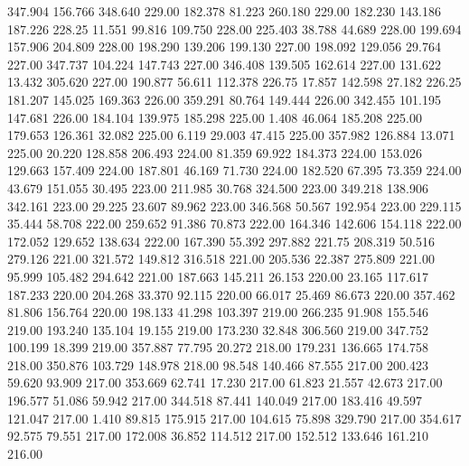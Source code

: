  347.904  156.766  348.640       229.00
 182.378   81.223  260.180       229.00
 182.230  143.186  187.226       228.25
  11.551   99.816  109.750       228.00
 225.403   38.788   44.689       228.00
 199.694  157.906  204.809       228.00
 198.290  139.206  199.130       227.00
 198.092  129.056   29.764       227.00
 347.737  104.224  147.743       227.00
 346.408  139.505  162.614       227.00
 131.622   13.432  305.620       227.00
 190.877   56.611  112.378       226.75
  17.857  142.598   27.182       226.25
 181.207  145.025  169.363       226.00
 359.291   80.764  149.444       226.00
 342.455  101.195  147.681       226.00
 184.104  139.975  185.298       225.00
   1.408   46.064  185.208       225.00
 179.653  126.361   32.082       225.00
   6.119   29.003   47.415       225.00
 357.982  126.884   13.071       225.00
  20.220  128.858  206.493       224.00
  81.359   69.922  184.373       224.00
 153.026  129.663  157.409       224.00
 187.801   46.169   71.730       224.00
 182.520   67.395   73.359       224.00
  43.679  151.055   30.495       223.00
 211.985   30.768  324.500       223.00
 349.218  138.906  342.161       223.00
  29.225   23.607   89.962       223.00
 346.568   50.567  192.954       223.00
 229.115   35.444   58.708       222.00
 259.652   91.386   70.873       222.00
 164.346  142.606  154.118       222.00
 172.052  129.652  138.634       222.00
 167.390   55.392  297.882       221.75
 208.319   50.516  279.126       221.00
 321.572  149.812  316.518       221.00
 205.536   22.387  275.809       221.00
  95.999  105.482  294.642       221.00
 187.663  145.211   26.153       220.00
  23.165  117.617  187.233       220.00
 204.268   33.370   92.115       220.00
  66.017   25.469   86.673       220.00
 357.462   81.806  156.764       220.00
 198.133   41.298  103.397       219.00
 266.235   91.908  155.546       219.00
 193.240  135.104   19.155       219.00
 173.230   32.848  306.560       219.00
 347.752  100.199   18.399       219.00
 357.887   77.795   20.272       218.00
 179.231  136.665  174.758       218.00
 350.876  103.729  148.978       218.00
  98.548  140.466   87.555       217.00
 200.423   59.620   93.909       217.00
 353.669   62.741   17.230       217.00
  61.823   21.557   42.673       217.00
 196.577   51.086   59.942       217.00
 344.518   87.441  140.049       217.00
 183.416   49.597  121.047       217.00
   1.410   89.815  175.915       217.00
 104.615   75.898  329.790       217.00
 354.617   92.575   79.551       217.00
 172.008   36.852  114.512       217.00
 152.512  133.646  161.210       216.00
